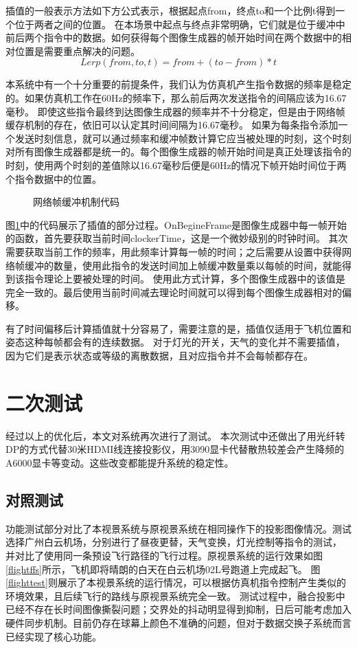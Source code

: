 \par
插值的一般表示方法如下方公式表示，根据起点from，终点to和一个比例t得到一个位于两者之间的位置。
在本场景中起点与终点非常明确，它们就是位于缓冲中前后两个指令中的数据。如何获得每个图像生成器的帧开始时间在两个数据中的相对位置是需要重点解决的问题。
$$Lerp(from,to,t)=from+(to-from)*t$$
\par
本系统中有一个十分重要的前提条件，我们认为仿真机产生指令数据的频率是稳定的。如果仿真机工作在60Hz的频率下，那么前后两次发送指令的间隔应该为16.67毫秒。
即使这些指令最终到达图像生成器的频率并不十分稳定，但是由于网络帧缓存机制的存在，依旧可以认定其时间间隔为16.67毫秒。
如果为每条指令添加一个发送时刻信息，就可以通过频率和缓冲帧数计算它应当被处理的时刻，这个时刻对所有图像生成器都是统一的。每个图像生成器的帧开始时间是真正处理该指令的时刻，使用两个时刻的差值除以16.67毫秒后便是60Hz的情况下帧开始时间位于两个指令数据中的位置。
\begin{figure}[h!]
    \centering
     
    \caption{网络帧缓冲机制代码}
    \label{lerpcode}
\end{figure}
\vspace{12pt}
\par
图\ref{lerpcode}中的代码展示了插值的部分过程。OnBegineFrame是图像生成器中每一帧开始的函数，首先要获取当前时间clockerTime，这是一个微妙级别的时钟时间。
其次需要获取当前工作的频率，用此频率计算每一帧的时间；之后需要从设置中获得网络帧缓冲的数量，使用此指令的发送时间加上帧缓冲数量乘以每帧的时间，就能得到该指令理论上要被处理的时间。
使用此方式计算，多个图像生成器中的该值是完全一致的。最后使用当前时间减去理论时间就可以得到每个图像生成器相对的偏移。
\par
有了时间偏移后计算插值就十分容易了，需要注意的是，插值仅适用于飞机位置和姿态这种每帧都会有的连续数据。
对于灯光的开关，天气的变化并不需要插值，因为它们是表示状态或等级的离散数据，且对应指令并不会每帧都存在。

\section{二次测试}
经过以上的优化后，本文对系统再次进行了测试。
本次测试中还做出了用光纤转DP的方式代替30米HDMI线连接投影仪，用3090显卡代替散热较差会产生降频的A6000显卡等变动。这些改变都能提升系统的稳定性。
\subsection{对照测试}
功能测试部分对比了本视景系统与原视景系统在相同操作下的投影图像情况。测试选择广州白云机场，分别进行了昼夜更替，天气变换，灯光控制等指令的测试，
并对比了使用同一条预设飞行路径的飞行过程。原视景系统的运行效果如图\ref{flightffs}所示，飞机即将晴朗的白天在白云机场02L号跑道上完成起飞。
图\ref{flighttest}则展示了本视景系统的运行情况，可以根据仿真机指令控制产生类似的环境效果，且后续飞行的路线与原视景系统完全一致。
测试过程中，融合投影中已经不存在长时间图像撕裂问题；交界处的抖动明显得到抑制，日后可能考虑加入硬件同步机制。目前仍存在球幕上颜色不准确的问题，但对于数据交换子系统而言已经实现了核心功能。


